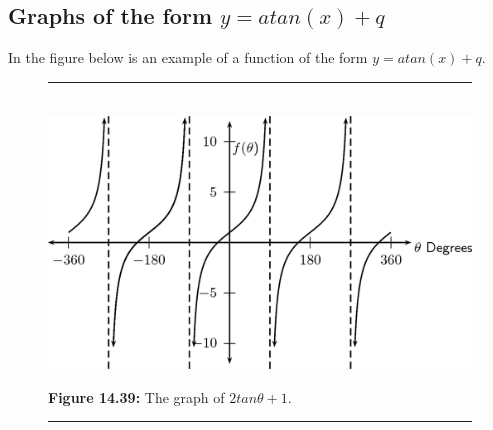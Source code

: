 \subsection*{Graphs of the form $y=atan(x)+q$}
\nopagebreak
In the figure below is an example of a function of the form $y=atan(x)+q$.\par 
\setcounter{subfigure}{0}
\begin{figure}[H] %
\begin{center}
\rule[.1in]{\figurerulewidth}{.005in} \\
\label{m39414*uid73!!!underscore!!!media}\label{m39414*uid73!!!underscore!!!printimage}\includegraphics{col11306.imgs/m39414_MG10C15_045.png} %
\vspace{2pt}
\vspace{\rubberspace}\par \begin{cnxcaption}
\small \textbf{Figure 14.39: }The graph of $2tan\theta +1$.
\end{cnxcaption}
\vspace{.1in}
\rule[.1in]{\figurerulewidth}{.005in} \\
\end{center}
\end{figure}       

